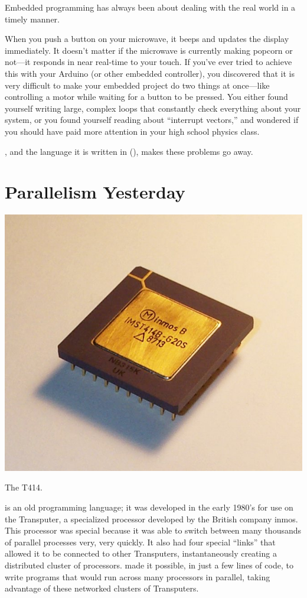 Embedded programming has always been about dealing with the real world in a timely manner.

When you push a button on your microwave, it beeps and updates the display immediately. It doesn't matter if the microwave is currently making popcorn or not---it responds in near real-time to your touch. If you've ever tried to achieve this with your Arduino (or other embedded controller), you discovered that it is very difficult to make your embedded project do two things at once---like controlling a motor while waiting for a button to be pressed. You either found yourself writing large, complex loops that constantly check everything about your system, or you found yourself reading about ``interrupt vectors,'' and wondered if you should have paid more attention in your high school physics class.

\plumbing, and the language it is written in (\occam), makes these problems go away.

\newpage

\section*{Parallelism Yesterday}
\begin{floatingfigure}[r]{0.4\linewidth}
	  \begin{center}
    	\includegraphics[width=0.4\linewidth]{images/t414}
			\captionsetup{labelformat=empty,justification=centering}
   		\caption{The T414.}
    	\label{image:t414}
  \end{center}
\end{floatingfigure}


\justoccam is an old programming language; it was developed in the early 1980's for use on the Transputer, a specialized processor developed by the British company inmos. This processor was special because it was able to switch between many thousands of parallel processes very, very quickly. It also had four special ``links'' that allowed it to be connected to other Transputers, instantaneously creating a distributed cluster of processors. \justoccam made it possible, in just a few lines of code, to write programs that would run across many processors in parallel, taking advantage of these networked clusters of Transputers.

